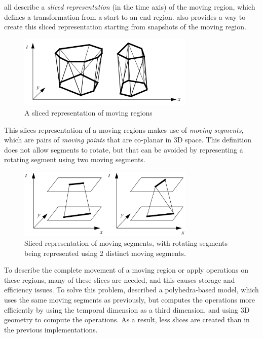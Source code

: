 \cite{algos_for_mod,model_structure_for_mod} all describe a \textit{sliced representation} (in the time axis) of the moving region, which defines a transformation from a start to an end region. \cite{repr_from_obs} also provides a way to create this sliced representation starting from snapshots of the moving region.

\begin{figure}[h!]
    \centering
    \includegraphics[width=0.75\textwidth]{images/sliced_moving_region.png}
    \caption{A sliced representation of moving regions \cite{polyhedra}}
    \label{fig:sliced_repr_polygons}
\end{figure}

This slices representation of a moving regions makes use of \textit{moving segments}, which are pairs of \textit{moving points} that are co-planar in 3D space. This definition does not allow segments to rotate, but that can be avoided by representing a rotating segment using two moving segments.

\begin{figure}[h!]
    \centering
    \includegraphics[width=0.75\textwidth]{images/sliced_moving_segments.png}
    \caption{Sliced representation of moving segments, with rotating segments being represented using 2 distinct moving segments. \cite{polyhedra}}
    \label{fig:sliced_repr_segments}
\end{figure}


To describe the complete movement of a moving region or apply operations on these regions, many of these slices are needed, and this causes storage and efficiency issues. To solve this problem, \cite{polyhedra} described a polyhedra-based model, which uses the same moving segments as previously, but computes the operations more efficiently by using the temporal dimension as a third dimension, and using 3D geometry to compute the operations. As a result, less slices are created than in the previous implementations.

